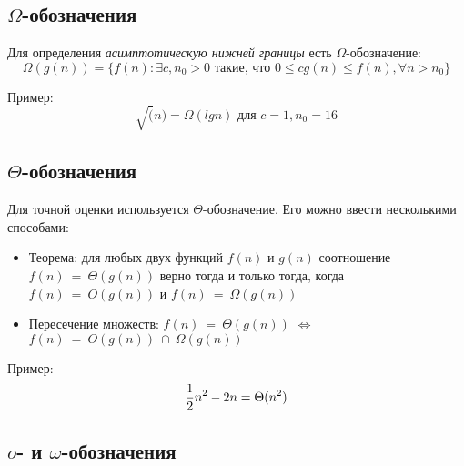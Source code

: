 \documentclass[11pt]{article}
\begin{document}
\subsection{$\Omega$-обозначения}

Для определения \emph{асимптотическую нижней границы} есть $\Omega$-обозначение:
\begin{equation*}
  \Omega(g(n)) = \{f(n): \exists c, n_0 > 0 \text{ такие, что }
  0 \leqslant c g(n) \leqslant f(n), \forall n > n_0
  \}
\end{equation*}

Пример:
\begin{equation*}
  \sqrt(n) = \Omega(lg n) \text{ для } c = 1, n_0 = 16
\end{equation*}

\subsection{$\Theta$-обозначения}

Для точной оценки используется $\Theta$-обозначение. Его можно ввести несколькими способами:
\begin{itemize}
\item Теорема: для любых двух функций $f(n)$ и $g(n)$ соотношение $f(n)~=~\Theta(g(n))$ верно тогда и только тогда, когда $f(n)~=~O(g(n))$ и $f(n)~=~\Omega(g(n))$
\item Пересечение множеств: $f(n)~=~\Theta(g(n))$ $\iff$ $f(n)~=~O(g(n))~\cap~\Omega(g(n))$
\end{itemize}

Пример:
\begin{equation*}
  {1 \over 2}n^2 - 2n = \Theta(n^2)
\end{equation*}

\subsection{$o$- и $\omega$-обозначения}
\end{document}
